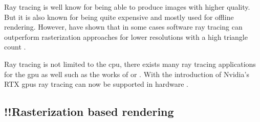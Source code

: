 Ray tracing is well know for being able to produce images with higher quality. But it is also known for being quite expensive and mostly used for offline rendering. However, \textcite{wald:2001:interactive} have shown that in some cases software ray tracing can  outperform rasterization approaches for lower resolutions with a high triangle count \cite{wald:2001:interactive}.

Ray tracing is not limited to the \gls{cpu}, there exists many ray tracing applications for the \gls{gpu} as well such as the works of \textcite{foley:2005:kd} or \textcite{parker:2010:optix}. With the introduction of Nvidia's RTX \glspl{gpu} ray tracing can now be supported in hardware \cite{raytracinggems}.


\iffalse
\subsection{!!Rasterization based rendering}




